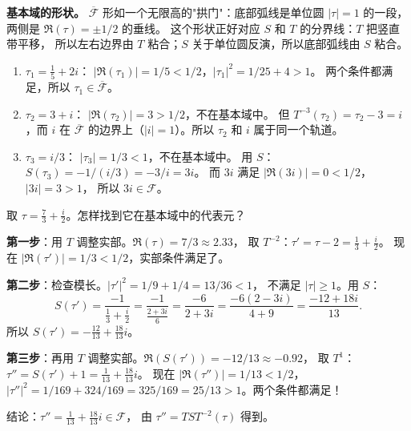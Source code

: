 \textbf{基本域的形状。}
$\overline{\mathcal{F}}$ 形如一个无限高的"拱门"：底部弧线是单位圆
$|\tau| = 1$ 的一段，两侧是 $\Re(\tau) = \pm 1/2$ 的垂线。
这个形状正好对应 $S$ 和 $T$ 的分界线：$T$ 把竖直带平移，
所以左右边界由 $T$ 粘合；$S$ 关于单位圆反演，所以底部弧线由 $S$ 粘合。

\begin{example}[判断一个点是否在基本域中]
\label{ex:point-in-F}
\leavevmode
\begin{enumerate}
  \item $\tau_1 = \frac{1}{5} + 2i$：
    $|\Re(\tau_1)| = 1/5 < 1/2$，$|\tau_1|^2 = 1/25 + 4 > 1$。
    两个条件都满足，所以 $\tau_1 \in \overline{\mathcal{F}}$。

  \item $\tau_2 = 3 + i$：
    $|\Re(\tau_2)| = 3 > 1/2$，不在基本域中。
    但 $T^{-3}(\tau_2) = \tau_2 - 3 = i$，而 $i$ 在 $\overline{\mathcal{F}}$
    的边界上（$|i| = 1$）。所以 $\tau_2$ 和 $i$ 属于同一个轨道。

  \item $\tau_3 = i/3$：
    $|\tau_3| = 1/3 < 1$，不在基本域中。
    用 $S$：$S(\tau_3) = -1/(i/3) = -3/i = 3i$。
    而 $3i$ 满足 $|\Re(3i)| = 0 < 1/2$，$|3i| = 3 > 1$，
    所以 $3i \in \mathcal{F}$。
\end{enumerate}
\end{example}

\begin{example}
\label{ex:reduce-to-F}
取 $\tau = \frac{7}{3} + \frac{i}{2}$。怎样找到它在基本域中的代表元？

\textbf{第一步}：用 $T$ 调整实部。$\Re(\tau) = 7/3 \approx 2.33$，
取 $T^{-2}$：$\tau' = \tau - 2 = \frac{1}{3} + \frac{i}{2}$。
现在 $|\Re(\tau')| = 1/3 < 1/2$，实部条件满足了。

\textbf{第二步}：检查模长。$|\tau'|^2 = 1/9 + 1/4 = 13/36 < 1$，
不满足 $|\tau| \geq 1$。用 $S$：
\[
  S(\tau') = \frac{-1}{\frac{1}{3} + \frac{i}{2}}
  = \frac{-1}{\frac{2 + 3i}{6}} = \frac{-6}{2 + 3i}
  = \frac{-6(2 - 3i)}{4 + 9} = \frac{-12 + 18i}{13}.
\]
所以 $S(\tau') = -\frac{12}{13} + \frac{18}{13}i$。

\textbf{第三步}：再用 $T$ 调整实部。$\Re(S(\tau')) = -12/13 \approx -0.92$，
取 $T^1$：$\tau'' = S(\tau') + 1 = \frac{1}{13} + \frac{18}{13}i$。
现在 $|\Re(\tau'')| = 1/13 < 1/2$，
$|\tau''|^2 = 1/169 + 324/169 = 325/169 = 25/13 > 1$。两个条件都满足！

结论：$\tau'' = \frac{1}{13} + \frac{18}{13}i \in \mathcal{F}$，
由 $\tau'' = TS T^{-2}(\tau)$ 得到。
\end{example}

